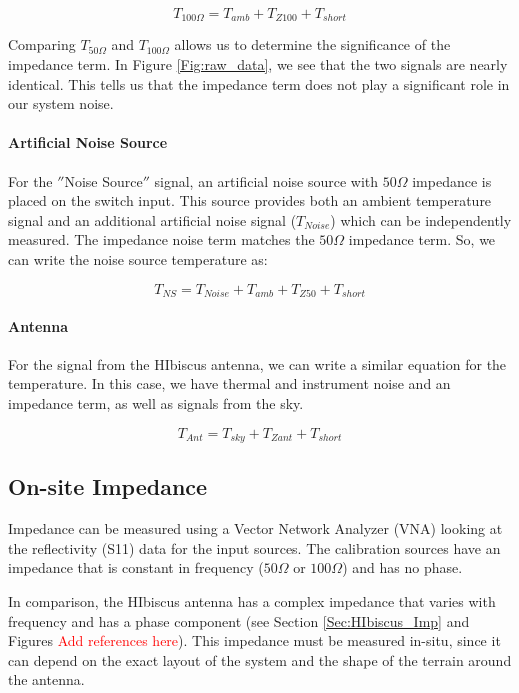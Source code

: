 \begin{equation}
T_{100 \Omega} = T_{amb}+T_{Z100}+T_{short}
\end{equation}

Comparing $T_{50 \Omega}$ and $T_{100 \Omega}$ allows us to determine the significance of the impedance term. In Figure \ref{Fig:raw_data}, we see that the two signals are nearly identical. This tells us that the impedance term does not play a significant role in our system noise.

\paragraph{Artificial Noise Source}
For the $''$Noise Source$''$ signal, an artificial noise source with $50 \Omega$ impedance is placed on the switch input. This source provides both an ambient temperature signal and an additional artificial noise signal ($T_{Noise}$) which can be independently measured. The impedance noise term matches the $50 \Omega$ impedance term. So, we can write the noise source temperature as:

\begin{equation}
T_{NS} = T_{Noise} + T_{amb}+T_{Z50}+T_{short}
\end{equation}


\paragraph{Antenna}
For the signal from the HIbiscus antenna, we can write a similar equation for the temperature. In this case, we have thermal and instrument noise and an impedance term, as well as signals from the sky. 

\begin{equation}\label{Eq:T_ant}
T_{Ant} = T_{sky}+T_{Zant}+T_{short}
\end{equation}

\subsection{On-site Impedance}
Impedance can be measured using a Vector Network Analyzer (VNA) looking at the reflectivity (S11) data for the input sources. The calibration sources have an impedance that is constant in frequency ($50 \Omega$ or $100 \Omega$) and has no phase.

In comparison, the HIbiscus antenna has a complex impedance that varies with frequency and has a phase component (see Section \ref{Sec:HIbiscus_Imp} and Figures \textcolor{red}{Add references here}). This impedance must be measured in-situ, since it can depend on the exact layout of the system and the shape of the terrain around the antenna. 

